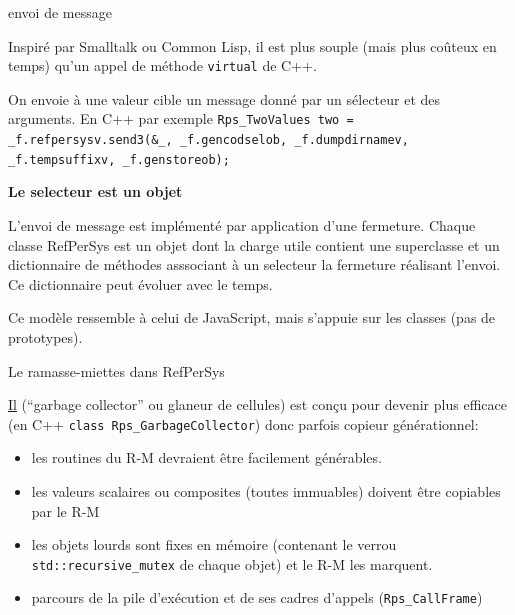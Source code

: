 \documentclass[final,a4,xcolor={svgnames,dvipsnames}]{beamer}
\begin{document}
 \begin{frame}{envoi de message}
   
   Inspiré par Smalltalk ou Common Lisp, il est plus souple (mais plus
   coûteux en temps) qu'un appel de méthode \texttt{virtual} de C++.

   \smallskip
   On envoie à une valeur cible un message donné par un sélecteur et des arguments.
   En C++ par exemple \texttt{Rps\_TwoValues two = \_f.refpersysv.send3(\&\_, \_f.gencodselob, \_f.dumpdirnamev, \_f.tempsuffixv, \_f.genstoreob);}

   \bigskip
   \textbf{Le selecteur est un objet}

   \bigskip
   L'envoi de message est implémenté par application d'une
   fermeture. Chaque classe RefPerSys est un objet dont la charge
   utile contient une superclasse et un dictionnaire de méthodes
   asssociant à un selecteur la fermeture réalisant l'envoi. Ce
   dictionnaire peut évoluer avec le temps.

   \smallskip
   \begin{small}
     Ce modèle ressemble à celui de JavaScript, mais s'appuie sur les
     classes (pas de prototypes).
   \end{small}
 \end{frame}
 
 \begin{frame}{Le ramasse-miettes dans RefPerSys}
   
   \href{https://fr.wikipedia.org/wiki/Ramasse-miettes_(informatique)}{Il}
   (``garbage collector'' ou glaneur de cellules) est conçu pour
   devenir plus efficace (en C++ \texttt{class Rps\_GarbageCollector})
   donc parfois copieur générationnel:

   \begin{itemize}
   \item les routines du R-M devraient être facilement générables.
   \item les valeurs scalaires ou composites (toutes immuables)
     doivent être copiables par le R-M
   \item les objets lourds sont fixes en mémoire (contenant le verrou \texttt{std::recursive\_mutex} de chaque objet) et le R-M les marquent.
     \item parcours de la pile d'exécution et de ses cadres d'appels (\texttt{Rps\_CallFrame})
   \end{itemize}
 \end{frame}
 
\end{document}
